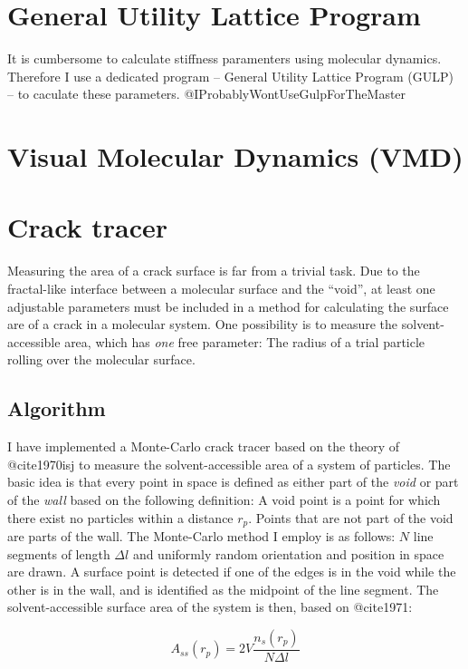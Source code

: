 \section{General Utility Lattice Program}
It is cumbersome to calculate stiffness paramenters using molecular dynamics. Therefore I use a dedicated program -- General Utility Lattice Program (GULP) -- to caculate these parameters. @IProbablyWontUseGulpForTheMaster

\section{Visual Molecular Dynamics (VMD)}


\section{Crack tracer}
Measuring the area of a crack surface is far from a trivial task. Due to the fractal-like interface between a molecular surface and the ``void'', at least one adjustable parameters must be included in a method for calculating the surface are of a crack in a molecular system. One possibility is to measure the solvent-accessible area, which has \emph{one} free parameter: The radius of a trial particle rolling over the molecular surface. 


\subsection{Algorithm}
I have implemented a Monte-Carlo crack tracer based on the theory of @cite1970isj to measure the solvent-accessible area of a system of particles. The basic idea is that every point in space is defined as either part of the \emph{void} or part of the \emph{wall} based on the following definition: A void point is a point for which there exist no particles within a distance $r_p$. Points that are not part of the void are parts of the wall. The Monte-Carlo method I employ is as follows: $N$ line segments of length $\Delta l$ and uniformly random orientation and position in space are drawn. A surface point is detected if one of the edges is in the void while the other is in the wall, and is identified as the midpoint of the line segment. The solvent-accessible surface area of the system is then, based on @cite1971:

\begin{equation}
A_{ss}(r_p) = 2V\frac{n_s(r_p)}{N\Delta l}
\end{equation}

